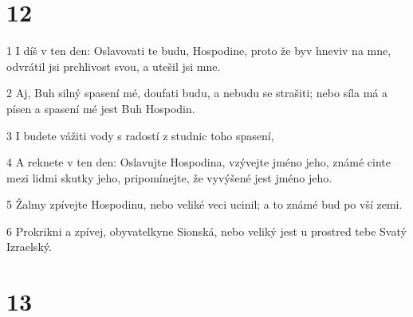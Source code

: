 \chapter{12}

\par 1 I díš v ten den: Oslavovati te budu, Hospodine, proto že byv hneviv na mne, odvrátil jsi prchlivost svou, a utešil jsi mne.
\par 2 Aj, Buh silný spasení mé, doufati budu, a nebudu se strašiti; nebo síla má a písen a spasení mé jest Buh Hospodin.
\par 3 I budete vážiti vody s radostí z studnic toho spasení,
\par 4 A reknete v ten den: Oslavujte Hospodina, vzývejte jméno jeho, známé cinte mezi lidmi skutky jeho, pripomínejte, že vyvýšené jest jméno jeho.
\par 5 Žalmy zpívejte Hospodinu, nebo veliké veci ucinil; a to známé bud po vší zemi.
\par 6 Prokrikni a zpívej, obyvatelkyne Sionská, nebo veliký jest u prostred tebe Svatý Izraelský.

\chapter{13}

